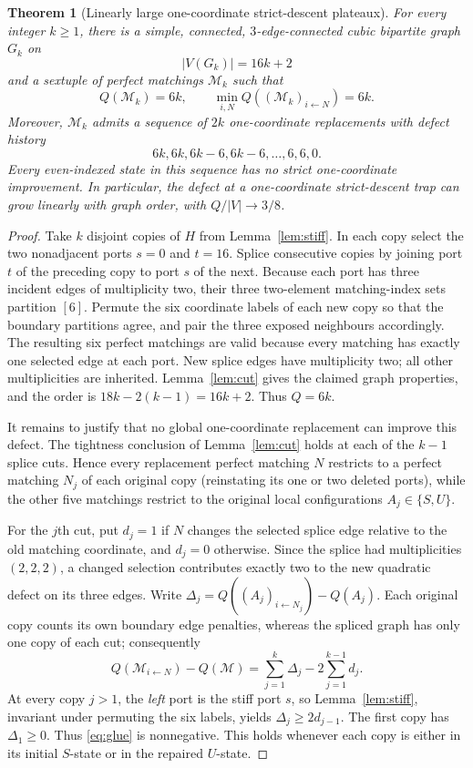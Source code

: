 \documentclass[11pt]{article}
\newtheorem{theorem}{Theorem}
\newcommand{\M}{\mathcal M}
\begin{document}
\begin{theorem}[Linearly large one-coordinate strict-descent plateaux]\label{thm:linear}
For every integer $k\ge1$, there is a \emph{simple, connected, $3$-edge-connected cubic bipartite} graph $G_k$ on
\[
|V(G_k)|=16k+2
\]
and a sextuple of perfect matchings $\M_k$ such that
\[
Q(\M_k)=6k,\qquad \min_{i,N}Q((\M_k)_{i\leftarrow N})=6k.
\]
Moreover, $\M_k$ admits a sequence of $2k$ one-coordinate replacements with defect history
\[
6k,6k,6k-6,6k-6,\ldots,6,6,0.
\]
Every even-indexed state in this sequence has no strict one-coordinate improvement. In particular, the defect at a one-coordinate strict-descent trap can grow linearly with graph order, with $Q/|V|\to3/8$.
\end{theorem}
\begin{proof}
Take $k$ disjoint copies of $H$ from Lemma~\ref{lem:stiff}. In each copy select the two nonadjacent ports $s=0$ and $t=16$. Splice consecutive copies by joining port $t$ of the preceding copy to port $s$ of the next. Because each port has three incident edges of multiplicity two, their three two-element matching-index sets partition $[6]$. Permute the six coordinate labels of each new copy so that the boundary partitions agree, and pair the three exposed neighbours accordingly. The resulting six perfect matchings are valid because every matching has exactly one selected edge at each port. New splice edges have multiplicity two; all other multiplicities are inherited. Lemma~\ref{lem:cut} gives the claimed graph properties, and the order is $18k-2(k-1)=16k+2$. Thus $Q=6k$.

It remains to justify that no global one-coordinate replacement can improve this defect. The tightness conclusion of Lemma~\ref{lem:cut} holds at each of the $k-1$ splice cuts. Hence every replacement perfect matching $N$ restricts to a perfect matching $N_j$ of each original copy (reinstating its one or two deleted ports), while the other five matchings restrict to the original local configurations $A_j\in\{S,U\}$.

For the $j$th cut, put $d_j=1$ if $N$ changes the selected splice edge relative to the old matching coordinate, and $d_j=0$ otherwise. Since the splice had multiplicities $(2,2,2)$, a changed selection contributes exactly two to the new quadratic defect on its three edges. Write $\Delta_j=Q((A_j)_{i\leftarrow N_j})-Q(A_j)$. Each original copy counts its own boundary edge penalties, whereas the spliced graph has only one copy of each cut; consequently
\begin{equation}\label{eq:glue}
Q(\M_{i\leftarrow N})-Q(\M)=\sum_{j=1}^k\Delta_j-2\sum_{j=1}^{k-1}d_j.
\end{equation}
At every copy $j>1$, the \emph{left} port is the stiff port $s$, so Lemma~\ref{lem:stiff}, invariant under permuting the six labels, yields $\Delta_j\ge2d_{j-1}$. The first copy has $\Delta_1\ge0$. Thus \eqref{eq:glue} is nonnegative. This holds whenever each copy is either in its initial $S$-state or in the repaired $U$-state.


\end{proof}
\end{document}
